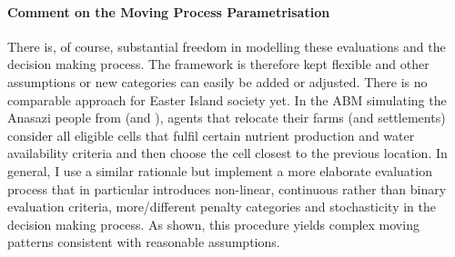\paragraph{Comment on the Moving Process Parametrisation}
There is, of course, substantial freedom in modelling these evaluations and the decision making process.
The framework is therefore kept flexible and other assumptions or new categories can easily be added or adjusted.
There is no comparable approach for Easter Island society yet.
In the ABM simulating the Anasazi people from \citet{Axtell2002} (and \citet{Janssen2009}), agents that relocate their farms (and settlements) consider all eligible cells that fulfil certain nutrient production and water availability criteria and then choose the cell closest to the previous location.
In general, I use a similar rationale but implement a more elaborate evaluation process that in particular introduces non-linear, continuous rather than binary evaluation criteria, more/different penalty categories and stochasticity in the decision making process.  
As shown, this procedure yields complex moving patterns consistent with reasonable assumptions.



